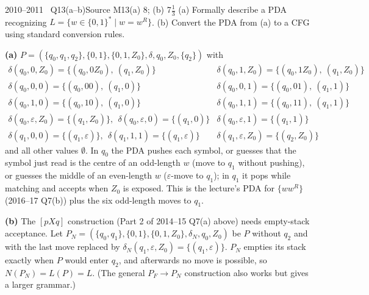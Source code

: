 \documentclass[11pt,a4paper]{article}
\newcommand{\eps}{\varepsilon}
\begin{document}
\begin{question}{2010--2011 \textbullet\ Q13(a--b)}{Source M13}{(a) 8; (b) 7$\tfrac13$}
(a) Formally describe a PDA recognizing $L=\{w\in\{0,1\}^*\mid w=w^R\}$. (b) Convert the PDA from (a) to a CFG using standard conversion rules.
\end{question}
\begin{solution}
\textbf{(a)} $P=(\{q_0,q_1,q_2\},\{0,1\},\{0,1,Z_0\},\delta,q_0,Z_0,\{q_2\})$ with
\[\begin{array}{ll}
\delta(q_0,0,Z_0)=\{(q_0,0Z_0),\ (q_1,Z_0)\} & \delta(q_0,1,Z_0)=\{(q_0,1Z_0),\ (q_1,Z_0)\}\\
\delta(q_0,0,0)=\{(q_0,00),\ (q_1,0)\} & \delta(q_0,0,1)=\{(q_0,01),\ (q_1,1)\}\\
\delta(q_0,1,0)=\{(q_0,10),\ (q_1,0)\} & \delta(q_0,1,1)=\{(q_0,11),\ (q_1,1)\}\\
\delta(q_0,\eps,Z_0)=\{(q_1,Z_0)\},\ \ \delta(q_0,\eps,0)=\{(q_1,0)\} & \delta(q_0,\eps,1)=\{(q_1,1)\}\\
\delta(q_1,0,0)=\{(q_1,\eps)\},\ \ \delta(q_1,1,1)=\{(q_1,\eps)\} & \delta(q_1,\eps,Z_0)=\{(q_2,Z_0)\}
\end{array}\]
and all other values $\emptyset$. In $q_0$ the PDA pushes each symbol, or guesses that the symbol just read is the centre of an odd-length $w$ (move to $q_1$ without pushing), or guesses the middle of an even-length $w$ ($\eps$-move to $q_1$); in $q_1$ it pops while matching and accepts when $Z_0$ is exposed. This is the lecture's PDA for $\{ww^R\}$ (2016--17 Q7(b)) plus the six odd-length moves to $q_1$.

\textbf{(b)} The $[pXq]$ construction (Part 2 of 2014--15 Q7(a) above) needs empty-stack acceptance. Let $P_N=(\{q_0,q_1\},\{0,1\},\{0,1,Z_0\},\delta_N,q_0,Z_0)$ be $P$ without $q_2$ and with the last move replaced by $\delta_N(q_1,\eps,Z_0)=\{(q_1,\eps)\}$. $P_N$ empties its stack exactly when $P$ would enter $q_2$, and afterwards no move is possible, so $N(P_N)=L(P)=L$. (The general $P_F\to P_N$ construction also works but gives a larger grammar.)


\end{solution}
\end{document}
